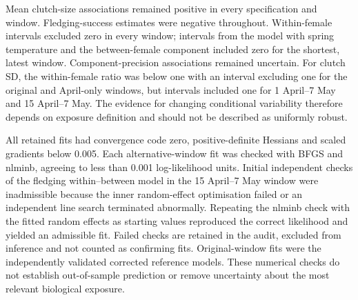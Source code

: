 \documentclass{article}
\begin{document}
\begin{table}[!ht]\centering\scriptsize\singlespacing
\caption{AIC for models fitted to identical records within each trait. The last column is AIC for the model separating within- and between-female associations minus AIC for the model with spring temperature. These descriptive comparisons do not select a causal exposure window.}\label{tab:window-aic}
\end{table}

Mean clutch-size associations remained positive in every specification and window. Fledging-success estimates were negative throughout. Within-female intervals excluded zero in every window; intervals from the model with spring temperature and the between-female component included zero for the shortest, latest window. Component-precision associations remained uncertain. For clutch SD, the within-female ratio was below one with an interval excluding one for the original and April-only windows, but intervals included one for 1 April--7 May and 15 April--7 May. The evidence for changing conditional variability therefore depends on exposure definition and should not be described as uniformly robust.

All retained fits had convergence code zero, positive-definite Hessians and scaled gradients below 0.005. Each alternative-window fit was checked with BFGS and nlminb, agreeing to less than 0.001 log-likelihood units. Initial independent checks of the fledging within--between model in the 15 April--7 May window were inadmissible because the inner random-effect optimisation failed or an independent line search terminated abnormally. Repeating the nlminb check with the fitted random effects as starting values reproduced the correct likelihood and yielded an admissible fit. Failed checks are retained in the audit, excluded from inference and not counted as confirming fits. Original-window fits were the independently validated corrected reference models. These numerical checks do not establish out-of-sample prediction or remove uncertainty about the most relevant biological exposure.
\end{document}

